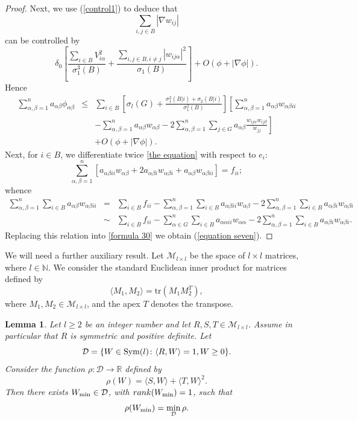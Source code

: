 \documentclass[12pt]{amsart}
\newtheorem{lemma}[theorem]{Lemma}
\newcommand{\R}{\mathbb R}
\newcommand{\N}{\mathbb N}
\newcommand{\1}{\mathbf 1}
\newcommand{\symm}{\mbox{\rm Sym}}
\newcommand{\M}{{\mathcal M}}
\begin{document}
\begin{proof}
Next, we use (\ref{control1}) to deduce that
$$
\sum_{i,j\in B}|\nabla w_{ij}|
$$ 
can be controlled by 
\[
\delta_0 \left[\frac{\sum_{i\in
B}V^2_{i\alpha}}{\sigma^3_{1}(B)} +\frac{\sum_{i,j\in B,
i\neq j}
|w_{ij\alpha}|^2}{\sigma_{1}(B)}\right] +O(\phi +|\nabla \phi|). 
\] 
Hence
\begin{eqnarray}\label{formula 30}
\sum_{\alpha,\beta=1}^na_{\alpha\beta}\phi_{\alpha\beta}&\le &\sum_{i\in B}\left[\sigma_l(G)+\frac{\sigma_{1}^{2}(B|i)+
\sigma_{2}(B|i)}{\sigma_{1}^{2}(B)}\right]\left[\sum_{\alpha,\beta=1}^na_{\alpha\beta}w_{\alpha\beta ii}\right.\\ \nonumber
&&\left.-\sum_{\alpha,\beta=1}^na_{\alpha\beta}w_{\alpha\beta}-2\sum_{\alpha,\beta=1}^n\sum_{j\in G}a_{\alpha\beta}\frac{w_{ij\alpha}w_{ij\beta}}{w_{jj}}\right]\\ \nonumber
&& +O(\phi +|\nabla \phi|).
\end{eqnarray}
Next, for $i\in B$, we differentiate twice \eqref{the equation} with respect to $e_i$: 
$$
\sum_{\alpha,\beta=1}^n\left[
a_{\alpha\beta ii}w_{\alpha\beta}+2a_{\alpha\beta i}w_{\alpha\beta i}+a_{\alpha\beta}w_{\alpha\beta ii}\right]=f_{ii};
$$
whence
\begin{eqnarray*}
\sum_{\alpha,\beta=1}^n\sum_{i\in B}a_{\alpha\beta}w_{\alpha\beta ii}&=&\sum_{i\in B}f_{ii}-
\sum_{\alpha,\beta=1}^n\sum_{i\in B}a_{\alpha\beta ii}w_{\alpha\beta}-2\sum_{\alpha,\beta=1}^n\sum_{i\in B}a_{\alpha\beta i}w_{\alpha\beta i}\\
&\sim&\sum_{i\in B}f_{ii}-\sum_{\alpha\in G}^n\sum_{i\in B}a_{\alpha\alpha ii}w_{\alpha\alpha}-2\sum_{\alpha,\beta=1}^n\sum_{i\in B}a_{\alpha\beta i}w_{\alpha\beta i}.
\end{eqnarray*}
Replacing this relation into \eqref{formula 30} we obtain (\ref{equation seven}).
\end{proof}

We will need a further auxiliary result. Let $\M_{l\times l}$ be the space of $l\times l$ matrices, where $l\in\N$. %
We consider the standard Euclidean inner product for matrices defined by
$$
\langle M_1,M_2\rangle=\mbox{tr}(M_1 M_2^T),
$$
where $M_1, M_2\in\M_{l\times l}$, and the apex $T$ denotes the transpose. %

\begin{lemma}\label{rank-reduction}  
Let $l\ge2$ be an integer number and let $R,S,T\in\M_{l\times l}$. Assume in particular that $R$ is symmetric and positive definite. Let 
$$
{\mathcal D}=\{W\in\symm(l)\colon\langle R,W\rangle=1, W\ge0\}.
$$
Consider the function $\rho\colon{\mathcal D}\to\R$ defined by
\[
\rho(W)=\langle S, W\rangle+\langle T,W\rangle^2.
\]
Then there exists $W_{\rm min}\in\mathcal D$, with $rank(W_{\rm min})=1$, such that 
$$
\rho(W_{\rm min})=\min_{\mathcal D}\rho.
$$
\end{lemma}
\end{document}

